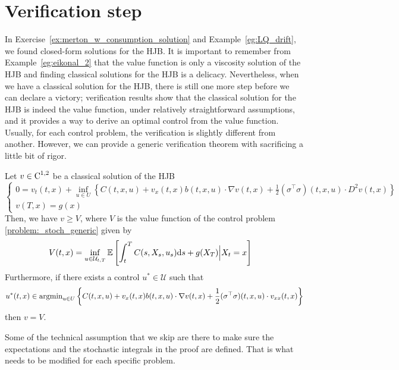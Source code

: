 \documentclass[11pt]{book}
\newcommand{\ds}{\text{\normalfont d}s}
\begin{document}
\section{Verification step}
In Exercise~\ref{ex:merton_w_consumption_solution} and Example~\ref{eg:LQ_drift}, we found closed-form solutions for the HJB. It is important to remember from Example~\ref{eg:eikonal_2} that the value function is only a viscosity solution of the HJB and finding classical solutions for the HJB is a delicacy. Nevertheless, when we have a classical solution for the HJB, there is still one more step before we can declare a victory; verification results show that the classical solution for the HJB is indeed the value function, under relatively straightforward assumptions, and it provides a way to derive an optimal control from the value function. Usually, for each control problem, the verification is slightly different from another. However, we can provide a generic verification theorem with sacrificing a little bit of rigor.
\begin{thm}\label{thm:verification}
    Let $v\in\text{\normalfont C}^{1,2}$ be a classical solution of the HJB 
    \[
    \begin{cases}
    0= v_t(t,x) + \inf_{u\in U}\left\{ C(t,x,u)  + v_x(t,x) b(t,x,u)\cdot \nabla v(t,x)+\frac12 (\sigma^\top\sigma)(t,x,u)\cdot D^2v(t,x) \right\}\\
    v(T,x)=g(x)
\end{cases}
\]
Then, we have $v\ge V$, where $V$ is the value function of the control problem \eqref{problem:_stoch_generic} given by 
\begin{equation}
\begin{split}
    V(t,x) &=\inf_{u\in\mathcal{U}_{t,T}}\mathbb{E}\left[\int_{t}^{T}C(s,X_s,u_s){{\ds}}+g(X_T)\Big|{X_t=x}\right]
\end{split}
\end{equation}
Furthermore, if there exists a control $u^*\in\mathcal{U}$ such that
\[
u^*(t,x)\in\text{\normalfont argmin}_{u\in U}\left\{  C(t,x,u)  + v_x(t,x) b(t,x,u)\cdot \nabla v(t,x)+\frac12 (\sigma^\top\sigma)(t,x,u)\cdot v_{xx}(t,x)\right\}
\]
then $v=V$.
\end{thm}
Some of the technical assumption that we skip are there to make sure the expectations and the stochastic integrals in the proof are defined. That is what needs to be modified for each specific problem.
\end{document}
